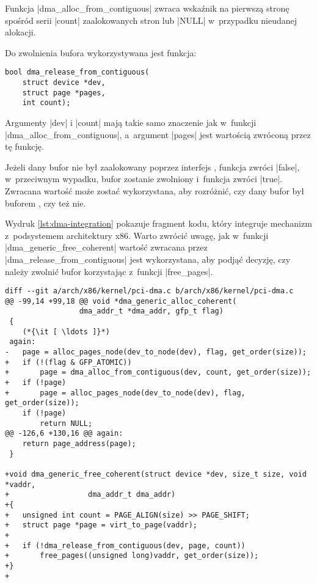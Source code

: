 Funkcja \code|dma_alloc_from_contiguous| zwraca wskaźnik na pierwszą
stronę spośród serii \code|count| zaalokowanych stron lub \code|NULL|
w~przypadku nieudanej alokacji.

Do zwolnienia bufora wykorzystywana jest funkcja:

\begin{lstlisting}
bool dma_release_from_contiguous(
	struct device *dev,
	struct page *pages,
	int count);
\end{lstlisting}

Argumenty \code|dev| i \code|count| mają takie samo
znaczenie jak w~funkcji \code|dma_alloc_from_contiguous|,
a~argument \code|pages| jest wartością zwróconą przez tę funkcję.

Jeżeli dany bufor nie był zaalokowany poprzez interfejs , funkcja
zwróci \code|false|, w~przeciwnym wypadku, bufor zostanie zwolniony
i~funkcja zwróci \code|true|.  Zwracana wartość może zostać
wykorzystana, aby rozróżnić, czy dany bufor był buforem , czy też
nie.

Wydruk \ref{lst:dma-integration} pokazuje fragment kodu, który
integruje mechanizm  z~podsystemem  architektury x86.  Warto
zwrócić uwagę, jak w~funkcji \code|dma_generic_free_coherent| wartość
zwracana przez \code|dma_release_from_contiguous| jest wykorzystana,
aby podjąć decyzję, czy należy zwolnić bufor korzystając z~funkcji
\code|free_pages|.

\begin{lstlisting}[float=bht,caption={Integracja alokatora \acc{CMA} z~podsystemem \acc{DMA}
      architektury x86.},label=lst:dma-integration]
diff --git a/arch/x86/kernel/pci-dma.c b/arch/x86/kernel/pci-dma.c
@@ -99,14 +99,18 @@ void *dma_generic_alloc_coherent(
 				 dma_addr_t *dma_addr, gfp_t flag)
 {
	(*{\it [ \ldots ]}*)
 again:
-	page = alloc_pages_node(dev_to_node(dev), flag, get_order(size));
+	if (!(flag & GFP_ATOMIC))
+		page = dma_alloc_from_contiguous(dev, count, get_order(size));
+	if (!page)
+		page = alloc_pages_node(dev_to_node(dev), flag, get_order(size));
 	if (!page)
 		return NULL;
@@ -126,6 +130,16 @@ again:
 	return page_address(page);
 }

+void dma_generic_free_coherent(struct device *dev, size_t size, void *vaddr,
+			       dma_addr_t dma_addr)
+{
+	unsigned int count = PAGE_ALIGN(size) >> PAGE_SHIFT;
+	struct page *page = virt_to_page(vaddr);
+
+	if (!dma_release_from_contiguous(dev, page, count))
+		free_pages((unsigned long)vaddr, get_order(size));
+}
+
\end{lstlisting}

